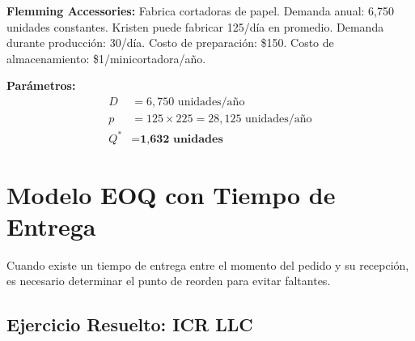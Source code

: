 \documentclass[12pt,a4paper]{book}
\begin{document}
	\begin{tcolorbox}[enhanced,colback=violetaclaro,colframe=moradoacento,boxrule=2pt,arc=8pt,
		drop shadow,title={\bfseries\color{white} \faPuzzlePiece\ PROBLEMA}]
		
		\textbf{Flemming Accessories:} Fabrica cortadoras de papel. Demanda anual: 6,750 unidades constantes. Kristen puede fabricar 125/día en promedio. Demanda durante producción: 30/día. Costo de preparación: \$150. Costo de almacenamiento: \$1/minicortadora/año.
		
	\end{tcolorbox}
	
	\begin{tcolorbox}[enhanced,colback=azulclaro,colframe=azulprincipal,boxrule=2pt,arc=8pt,
		title={\bfseries\color{white} \faCalculator\ SOLUCIÓN}]
		
		\textbf{Parámetros:}
		\begin{align}
			D &= 6,750 \text{ unidades/año}\\
			p &= 125 \times 225 = 28,125 \text{ unidades/año}\\
			Q^* &= \textbf{1,632 unidades}
		\end{align}
		
	\end{tcolorbox}
	
	\section{Modelo EOQ con Tiempo de Entrega}
	
	\begin{tcolorbox}[enhanced,colback=naranjaclaro,colframe=naranjaacento,boxrule=3pt,arc=12pt,
		drop shadow,title={\Large\bfseries\color{white} \faHourglass\ FUNDAMENTOS DEL MODELO}]
		
		Cuando existe un tiempo de entrega entre el momento del pedido y su recepción, es necesario determinar el punto de reorden para evitar faltantes.
		
	\end{tcolorbox}
	
	\subsection{Ejercicio Resuelto: ICR LLC}
	
\end{document}
